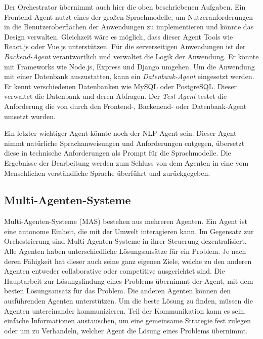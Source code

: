 Der Orchestrator übernimmt auch hier die oben beschriebenen Aufgaben. Ein Frontend-Agent nutzt eines der großen Sprachmodelle, um Nutzeranforderungen in die Benutzeroberflächen der Anwendungen zu implementieren und könnte das Design verwalten. Gleichzeit wäre es möglich, dass dieser Agent Tools wie React.js oder Vue.js unterstützen. Für die serverseitigen Anwendungen ist der \textit{Backend-Agent} verantwortlich und verwaltet die Logik der Anwendung. Er könnte mit Frameworks wie Node.js, Express und Django umgehen. Um die Anwendung mit einer Datenbank auszustatten, kann ein \textit{Datenbank-Agent} eingesetzt werden. Er kennt verschiedenen Datenbanken wie MySQL oder PostgreSQL. Dieser verwaltet die Datenbank und deren Abfragen. Der \textit{Test-Agent} testet die Anforderung die von durch den Frontend-, Backenend- oder Datenbank-Agent umsetzt wurden.\vspace{0.2cm}

Ein letzter wichtiger Agent könnte noch der NLP-Agent sein. Dieser Agent nimmt natürliche Sprachanweisungen und Anforderungen entgegen, übersetzt diese in technische Anforderungen als Prompt für die Sprachmodelle. Die Ergebnisse der Bearbeitung werden zum Schluss von dem Agenten in eine vom Menschlichen verständliche Sprache überführt und zurückgegeben.

\subsection{Multi-Agenten-Systeme}
Multi-Agenten-Systeme (\acrshort{MAS}) bestehen aus mehreren Agenten. Ein Agent ist eine autonome Einheit, die mit der Umwelt interagieren kann. Im Gegensatz zur Orchestrierung sind Multi-Agenten-Systeme in ihrer Steuerung dezentralisiert. Alle Agenten haben unterschiedliche Lösungsansätze für ein Problem. Je nach deren Fähigkeit hat dieser auch seine ganz eigenen Ziele, welche zu den anderen Agenten entweder \gls{collaborative} oder \gls{competitive} ausgerichtet sind. Die Hauptarbeit zur Lösungsfindung eines Problems übernimmt der Agent, mit dem besten Lösungsansatz für das Problem. Die anderen Agenten können den ausführenden Agenten unterstützen. Um die beste Lösung zu finden, müssen die Agenten untereinander kommunizieren.  Teil der Kommunikation kann es sein, einfache Informationen austauschen, um eine gemeinsame Strategie fest zulegen oder um zu Verhandeln, welcher Agent die Lösung eines Problems übernimmt.\vspace{0.2cm}

